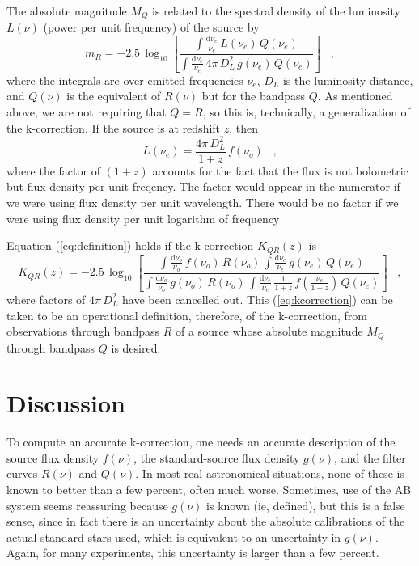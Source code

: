 \documentclass[12pt,preprint]{aastex}
\begin{document}
The absolute magnitude $M_Q$ is related to the spectral density of the
luminosity $L(\nu)$ (power per unit frequency) of the source by
\begin{equation}
m_R = -2.5\,\log_{10}\left[
  \frac{\int\frac{\mathrm{d}\nu_e}{\nu_e}\,L(\nu_e)\,             Q(\nu_e)}
       {\int\frac{\mathrm{d}\nu_e}{\nu_e}\,4\pi\,D_L^2\,g(\nu_e)\,Q(\nu_e)}
\right] \;\;\;,
\end{equation}
where the integrals are over emitted frequencies $\nu_e$, $D_L$ is the
luminosity distance, and $Q(\nu)$ is the equivalent of $R(\nu)$ but
for the bandpass $Q$.  As mentioned above, we are not requiring that
$Q=R$, so this is, technically, a generalization of the k-correction.
If the source is at redshift $z$, then
\begin{equation}
L(\nu_e) = \frac{4\pi\,D_L^2}{1+z}\,f(\nu_o) \;\;\;,
\end{equation}
where the factor of $(1+z)$ accounts for the fact that the flux is not
bolometric but flux density per unit freqency.  The factor would
appear in the numerator if we were using flux density per unit
wavelength.  There would be no factor if we were using flux density
per unit logarithm of frequency

Equation (\ref{eq:definition}) holds if the k-correction $K_{QR}(z)$
is
\begin{equation}
\label{eq:kcorrection}
K_{QR}(z) = -2.5\,\log_{10}\left[
  \frac{\int\frac{\mathrm{d}\nu_o}{\nu_o}\,f(\nu_o)\,R(\nu_o)\,
        \int\frac{\mathrm{d}\nu_e}{\nu_e}\,
          g(\nu_e)\,Q(\nu_e)}
       {\int\frac{\mathrm{d}\nu_o}{\nu_o}\,g(\nu_o)\,R(\nu_o)\,
        \int\frac{\mathrm{d}\nu_e}{\nu_e}\,\frac{1}{1+z}\,
          f\left(\frac{\nu_e}{1+z}\right)\,Q(\nu_e)}
\right] \;\;\;,
\end{equation}
where factors of $4\pi\,D_L^2$ have been cancelled out.  This
(\ref{eq:kcorrection}) can be taken to be an operational definition,
therefore, of the k-correction, from observations through bandpass $R$
of a source whose absolute magnitude $M_Q$ through bandpass $Q$ is
desired.

\section{Discussion}

To compute an accurate k-correction, one needs an accurate description
of the source flux density $f(\nu)$, the standard-source flux density
$g(\nu)$, and the filter curves $R(\nu)$ and $Q(\nu)$.  In most real
astronomical situations, none of these is known to better than a few
percent, often much worse.  Sometimes, use of the AB system seems
reassuring because $g(\nu)$ is known (ie, defined), but this is a
false sense, since in fact there is an uncertainty about the absolute
calibrations of the actual standard stars used, which is equivalent to
an uncertainty in $g(\nu)$.  Again, for many experiments, this
uncertainty is larger than a few percent.
\end{document}
